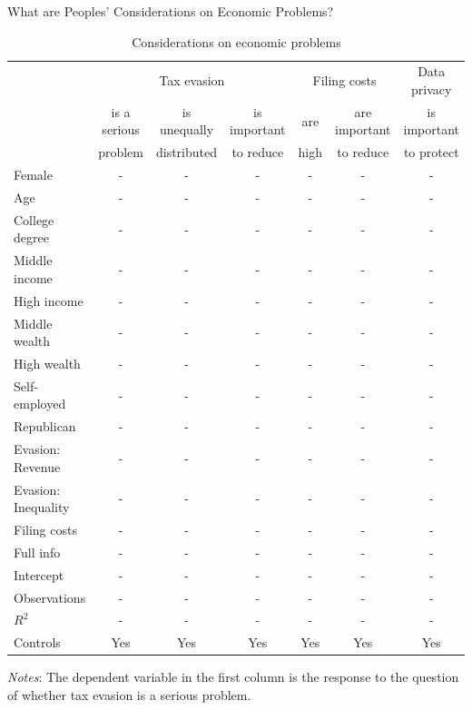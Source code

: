 \documentclass{beamer}
\begin{document}
\begin{frame}{What are Peoples' Considerations on Economic Problems?}
\label{Example:ConsiderationsEconomicProblems}
\begin{table}[!htbp]\centering
\tiny
\caption{Considerations on economic problems}
\begin{threeparttable}
\begin{tabular}{l|ccc|cc|c}
\toprule
 & \multicolumn{3}{c}{Tax evasion} & \multicolumn{2}{c}{Filing costs} & Data privacy\\
 & is a serious &is unequally & is important & are & are important  & is important  \\
  &  problem & distributed & to reduce & high& to reduce & to protect  \\
\midrule
Female                     &-& - & - &-& - & -  \\
Age                        &-& - & - &-& - & -  \\
College degree             &-& - & - &-& - & -  \\
Middle income              &-& - & - &-& - & -  \\
High income                &-& - & - &-& - & -  \\
Middle wealth              &-& - & - &-& - & -  \\
High wealth                &-& - & - &-& - & -  \\
Self-employed              &-& - & - &-& - & -  \\
Republican                 &-& - & - &-& - & -  \\[1em]
Evasion: Revenue        & - & - & - & - & - & - \\
Evasion: Inequality     & - & - & - & - & - & - \\
Filing costs            & - & - & - & - & - & - \\
Full info               & - & - & - & - & - & - \\[0.5em]
\midrule
Intercept &- &- &- &- &- &-   \\
Observations                        &-    &-    &-    &-    &-    &-         \\
$R^2$                               &-    &-    &-    &-    &-    &-         \\
Controls                 & Yes     & Yes    & Yes    & Yes     & Yes    & Yes      \\
\bottomrule
\end{tabular}
\begin{tablenotes}[flushleft]
\item \textit{Notes}: The dependent variable in the first column is the response to the question of whether tax evasion is a serious problem. 
\end{tablenotes}
\end{threeparttable}
\end{table}
\hfill \hyperlink{posttreatment}{}
\end{frame}
\end{document}
